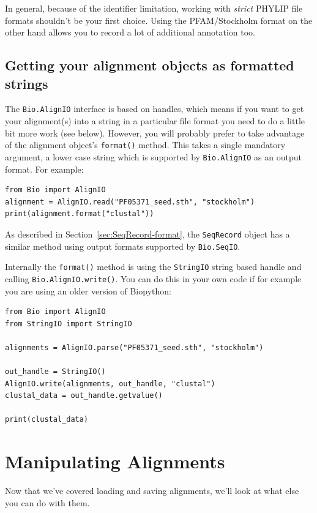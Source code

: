 \documentclass{report}
\begin{document}
\noindent In general, because of the identifier limitation, working with
\textit{strict} PHYLIP file formats shouldn't be your first choice. 
Using the PFAM/Stockholm format on the other hand allows you to record a lot of additional annotation too.

\subsection{Getting your alignment objects as formatted strings}
\label{sec:alignment-format-method}
The \verb|Bio.AlignIO| interface is based on handles, which means if you want to get your alignment(s) into a string in a particular file format you need to do a little bit more work (see below).  
However, you will probably prefer to take advantage of the alignment object's \verb|format()| method.
This takes a single mandatory argument, a lower case string which is supported by \verb|Bio.AlignIO| as an output format.  For example:

\begin{verbatim}
from Bio import AlignIO
alignment = AlignIO.read("PF05371_seed.sth", "stockholm")
print(alignment.format("clustal"))
\end{verbatim}

As described in Section~\ref{sec:SeqRecord-format}, the \verb|SeqRecord| object has a similar method using output formats supported by \verb|Bio.SeqIO|.

Internally the \verb|format()| method is using the \verb|StringIO| string based handle and calling
\verb|Bio.AlignIO.write()|.  You can do this in your own code if for example you are using an
older version of Biopython:

\begin{verbatim}
from Bio import AlignIO
from StringIO import StringIO

alignments = AlignIO.parse("PF05371_seed.sth", "stockholm")

out_handle = StringIO()
AlignIO.write(alignments, out_handle, "clustal")
clustal_data = out_handle.getvalue()

print(clustal_data)
\end{verbatim}

\section{Manipulating Alignments}
\label{sec:manipulating-alignments}

Now that we've covered loading and saving alignments, we'll look at what else you can do
with them.
\end{document}
